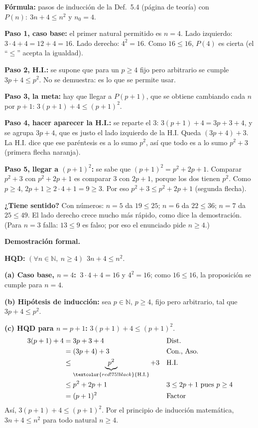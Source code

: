 \documentclass[11pt]{article}
\begin{document}
\begin{explica}
\textbf{Fórmula:} pasos de inducción de la Def.~5.4 (página de teoría) con $P(n):\ 3n+4\le n^2$ y $n_0=4$.

\textbf{Paso 1, caso base:} el primer natural permitido es $n=4$. Lado izquierdo: $3\cdot 4+4=12+4=16$. Lado derecho: $4^2=16$. Como $16\le 16$, $P(4)$ es cierta (el ``$\le$'' acepta la igualdad).

\textbf{Paso 2, H.I.:} se supone que para un $p\ge 4$ fijo pero arbitrario se cumple $3p+4\le p^2$. No se demuestra: es lo que se permite usar.

\textbf{Paso 3, la meta:} hay que llegar a $P(p+1)$, que se obtiene cambiando cada $n$ por $p+1$: $3(p+1)+4\le (p+1)^2$.

\textbf{Paso 4, hacer aparecer la H.I.:} se reparte el $3$: $3(p+1)+4=3p+3+4$, y se agrupa $3p+4$, que es justo el lado izquierdo de la H.I. Queda $(3p+4)+3$. La H.I. dice que ese paréntesis es a lo sumo $p^2$, así que todo es a lo sumo $p^2+3$ (primera flecha naranja).

\textbf{Paso 5, llegar a $(p+1)^2$:} se sabe que $(p+1)^2=p^2+2p+1$. Comparar $p^2+3$ con $p^2+2p+1$ es comparar $3$ con $2p+1$, porque los dos tienen $p^2$. Como $p\ge 4$, $2p+1\ge 2\cdot 4+1=9\ge 3$. Por eso $p^2+3\le p^2+2p+1$ (segunda flecha).

\textbf{¿Tiene sentido?} Con números: $n=5$ da $19\le 25$; $n=6$ da $22\le 36$; $n=7$ da $25\le 49$. El lado derecho crece mucho más rápido, como dice la demostración. (Para $n=3$ falla: $13\le 9$ es falso; por eso el enunciado pide $n\ge 4$.)
\end{explica}

\textbf{Demostración formal.}

\textbf{HQD:} $(\forall n\in\mathbb N,\ n\ge 4)\ \ 3n+4\le n^2$.

\textbf{(a) Caso base, $n=4$:} $\ 3\cdot 4+4=16$ y $4^2=16$; como $16\le 16$, la proposición se cumple para $n=4$.

\textbf{(b) Hipótesis de inducción:} sea $p\in\mathbb N$, $p\ge 4$, fijo pero arbitrario, tal que $3p+4\le p^2$.

\textbf{(c) HQD para $n=p+1$:} $3(p+1)+4\le (p+1)^2$.
\begin{align*}
3(p+1)+4 &= 3p+3+4 && \text{Dist.}\\
&= (3p+4)+3 && \text{Con., Aso.}\\
&\le \underbrace{p^2}_{\textcolor{red!75!black}{\text{H.I.}}}+3 && \text{H.I.}\\
&\le p^2+2p+1 && 3\le 2p+1 \text{ pues } p\ge 4\\
&= (p+1)^2 && \text{Factor}
\end{align*}
Así, $3(p+1)+4\le (p+1)^2$. Por el principio de inducción matemática, $3n+4\le n^2$ para todo natural $n\ge 4$.
\end{document}
